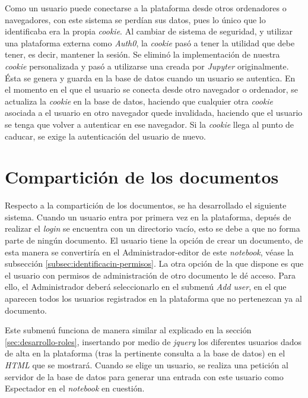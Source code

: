 \documentclass[11pt,spanish,listoffigures]{tfgetsinf}
\begin{document}
Como un usuario puede conectarse a la plataforma desde otros ordenadores o navegadores, con este sistema se perdían sus datos, pues lo único que lo identificaba era la propia \textit{cookie}. Al cambiar de sistema de seguridad, y utilizar una plataforma externa como \textit{Auth0}, la \textit{cookie} pasó a tener la utilidad que debe tener, es decir, mantener la sesión. Se eliminó la implementación de nuestra \textit{cookie} personalizada y pasó a utilizarse una creada por \textit{Jupyter} originalmente. Ésta se genera y guarda en la base de datos cuando un usuario se autentica. En el momento en el que el usuario se conecta desde otro navegador o ordenador, se actualiza la \textit{cookie} en la base de datos, haciendo que cualquier otra \textit{cookie} asociada a el usuario en otro navegador quede invalidada, haciendo que el usuario se tenga que volver a autenticar en ese navegador. Si la \textit{cookie} llega al punto de caducar, se exige la autenticación del usuario de nuevo.



\section{Compartición de los documentos}
\label{sec:desarrollo-comparticion}

Respecto a la compartición de los documentos, se ha desarrollado el siguiente sistema. Cuando un usuario entra por primera vez en la plataforma, depués de realizar el \textit{login} se encuentra con un directorio vacío, esto se debe a que no forma parte de ningún documento. El usuario tiene la opción de crear un documento, de esta manera se convertiría en el Administrador-editor de este \textit{notebook}, véase la subsección \ref{subsec:identificacin-permisos}. La otra opción de la que dispone es que el usuario con permisos de administración de otro documento le dé acceso. Para ello, el Administrador deberá seleccionarlo en el submenú \textit{Add user}, en el que aparecen todos los usuarios registrados en la plataforma que no pertenezcan ya al documento.

Este submenú funciona de manera similar al explicado en la sección \ref{sec:desarrollo-roles}, insertando por medio de \textit{jquery} los diferentes usuarios dados de alta en la plataforma (tras la pertinente consulta a la base de datos) en el \textit{HTML} que se mostrará. Cuando se elige un usuario, se realiza una petición al servidor de la base de datos para generar una entrada con este usuario como Espectador en el \textit{notebook} en cuestión.
\end{document}
